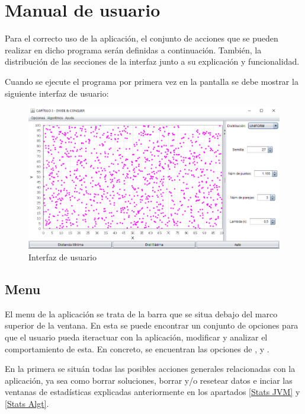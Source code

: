 \section{Manual de usuario}\label{Manual usuario}

Para el correcto uso de la aplicación, el conjunto de acciones que se pueden realizar en dicho programa serán definidas a continuación. También, la distribución de las secciones de la interfaz junto a su explicación y funcionalidad.\bigskip

Cuando se ejecute el programa por primera vez en la pantalla se debe mostrar la siguiente interfaz de usuario:

\begin{figure}[!h]
    \centering
    \includegraphics[width=\linewidth]{Usage/img/GUI.png}
    \caption{Interfaz de usuario}
    \label{fig:User_interface}
\end{figure}

\subsection{Menu}\label{Manual usuario, Header}

El menu de la aplicación se trata de la barra que se situa debajo del marco superior de la ventana. En esta se puede encontrar un conjunto de opciones para que el usuario pueda iteractuar con la aplicación, modificar y analizar el comportamiento de esta. En concreto, se encuentran las opciones de ,  y .\bigskip

En la primera se situán todas las posibles acciones generales relacionadas con la aplicación, ya sea como borrar soluciones, borrar y/o resetear datos e inciar las ventanas de estadísticas explicadas anteriormente en los apartados \ref{Stats JVM} y \ref{Stats Algt}.\bigskip

